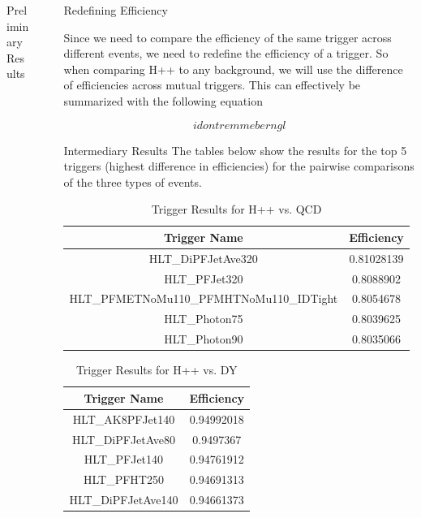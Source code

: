 \documentclass[final]{beamer}
\newlength{\sepwidth}
\newlength{\colwidth}
\newcommand{\separatorcolumn}{\begin{column}{\sepwidth}\end{column}}
\begin{document}
\begin{frame}[t]
\begin{columns}[t]
\begin{column}{\colwidth}
\begin{block}{Preliminary Results}
  \end{block}

\end{column}

\separatorcolumn

\begin{column}{\colwidth}

  \begin{block}{Redefining Efficiency}

    Since we need to compare the efficiency of the same trigger across different events, we need to redefine the efficiency of a trigger. So when comparing H++ to any background, we will use the difference of efficiencies across mutual triggers. This can effectively be summarized with the following equation 

    $$i dont remmeber ngl$$
    
  \end{block}

  \begin{block}{Intermediary Results}
    The tables below show the results for the top 5 triggers (highest difference in efficiencies) for the pairwise comparisons of the three types of events.
    \begin{table}[h!]
      \caption{\label{table:4}Trigger Results for H++ vs. QCD}
          \begin{tabular}[t]{c|c}
              \hline
              \textbf{Trigger Name} & \textbf{Efficiency}\\
              \hline
              HLT\_DiPFJetAve320 & 0.81028139\\
              HLT\_PFJet320 & 0.8088902\\
              HLT\_PFMETNoMu110\_PFMHTNoMu110\_IDTight & 0.8054678 \\
              HLT\_Photon75 & 0.8039625 \\
              HLT\_Photon90 & 0.8035066 
          \end{tabular}
    \end{table}

    \begin{table}[h!]
      \caption{\label{table:5}Trigger Results for H++ vs. DY}
          \begin{tabular}[t]{c|c}
              \hline
              \textbf{Trigger Name} & \textbf{Efficiency}\\
              \hline
              HLT\_AK8PFJet140 & 0.94992018\\
              HLT\_DiPFJetAve80 & 0.9497367\\
              HLT\_PFJet140 & 0.94761912 \\
              HLT\_PFHT250 & 0.94691313 \\
              HLT\_DiPFJetAve140 & 0.94661373
          \end{tabular}
    \end{table}
  \end{block}


\end{column}
\end{columns}
\end{frame}
\end{document}
